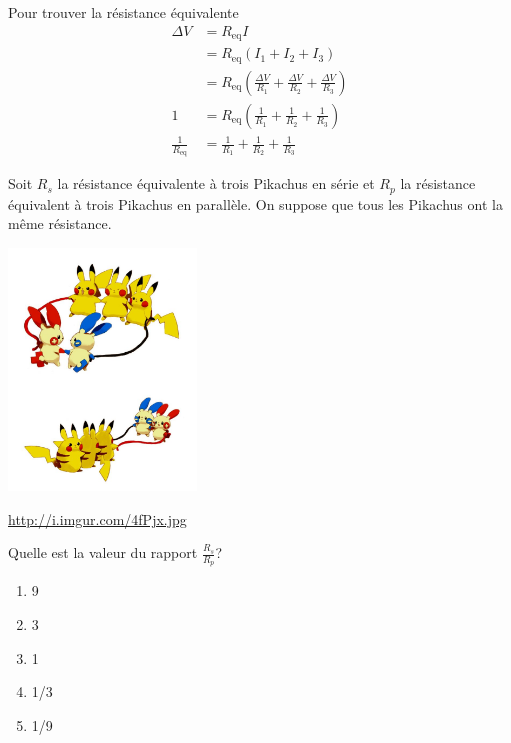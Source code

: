 Pour trouver la résistance équivalente
\begin{align*}
  \Delta V &= R_\mathrm{eq} I \\
           &= R_\mathrm{eq} (I_1 + I_2 + I_3) \\
           &= R_\mathrm{eq} \left( \frac{\Delta V}{R_1} + \frac{\Delta V}{R_2}
              + \frac{\Delta V}{R_3} \right) \\
         1 &= R_\mathrm{eq} \left( \frac{1}{R_1} + \frac{1}{R_2}
              + \frac{1}{R_3} \right) \\
    \frac{1}{R_\mathrm{eq}} &= \frac{1}{R_1} + \frac{1}{R_2} + \frac{1}{R_3}
\end{align*}


\begin{diapobox}

Soit $R_{s}$ la résistance équivalente à trois Pikachus en série et $R_p$ la
résistance équivalent à trois Pikachus en parallèle. On suppose que tous les
Pikachus ont la même résistance.

\begin{center}
  \includegraphics[width=5cm]{07-circuits-cc/figures/series-parallel-pikachu.jpg}
\end{center}
\begin{flushright}
  {\tiny \url{http://i.imgur.com/4fPjx.jpg} }
\end{flushright}

Quelle est la valeur du rapport $\frac{R_s}{R_p}$?

\begin{enumerate}
  \item 9
  \item 3
  \item 1
  \item 1/3
  \item 1/9
\end{enumerate}

\end{diapobox}




